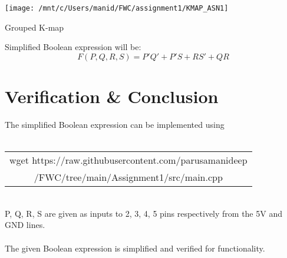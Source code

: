 \documentclass[journal,12pt,twocolumn]{IEEEtran}
\begin{document}
\begin{table}[h]
    \centering
    \texttt{[image: /mnt/c/Users/manid/FWC/assignment1/KMAP\_ASN1]}
    \vspace{4pt}
    \caption{Grouped K-map}
    \label{fig:my_label}
\end{table}
Simplified Boolean expression will be:
$$F(P,Q,R,S) = P'Q' + P'S + RS' + QR$$

\section{Verification \& Conclusion}
The simplified Boolean expression can be implemented using 
\\
\\
\vspace{10pt}
\begin{tabular}{|c|}
    \hline

wget https://raw.githubusercontent.com/parusamanideep\\/FWC/tree/main/Assignment1/src/main.cpp

     \\ \hline
\end{tabular} \\
P, Q, R, S are given as inputs to 2, 3, 4, 5 pins respectively from the 5V and GND lines.
\\
\\
The given Boolean expression is simplified and verified for functionality.
\end{document}
